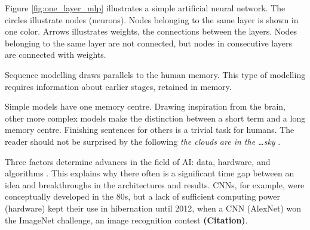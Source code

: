 Figure \ref{fig:one_layer_mlp} illustrates a simple artificial neural network. The circles illustrate nodes (neurons). Nodes belonging to the same layer is shown in one color. Arrows illustrates weights, the connections between the layers. Nodes belonging to the same layer are not connected, but nodes in consecutive layers are connected with weights. 



Sequence modelling draws parallels to the human memory. This type of modelling requires information about earlier stages, retained in memory. 

Simple models have one memory centre. Drawing inspiration from the brain, other more complex models make the distinction between a short term and a long memory centre. Finishing sentences for others is a trivial task for humans. The reader should not be surprised by the following \textit{the clouds are in the \ldots sky} \cite{colah_blog_post}.

Three factors determine advances in the field of AI: data, hardware, and algorithms \cite{chollet_book}. This explains why there often is a significant time gap between an idea and breakthroughs in the architectures and results. CNNs, for example, were conceptually developed in the 80s, but a lack of sufficient computing power (hardware) kept their use in hibernation until 2012, when a CNN (AlexNet) won the ImageNet challenge, an image recognition contest \textbf{(Citation)}.

